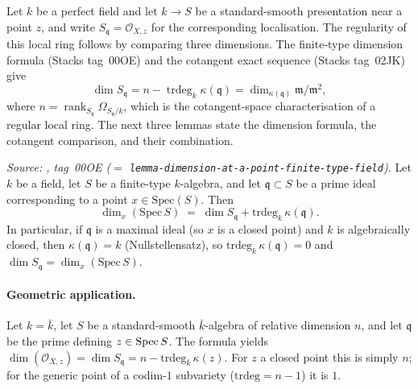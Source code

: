 Let \(k\) be a perfect field and let \(k \to S\) be a standard-smooth
presentation near a point \(z\),
and write \(S_{\mathfrak q}=\mathcal O_{X,z}\) for the corresponding
localisation.  The regularity of this local ring follows by comparing
three dimensions.  The finite-type dimension formula (Stacks tag~00OE)
and the cotangent exact sequence (Stacks tag~02JK) give
\[
  \dim S_{\mathfrak q}
  = n-\operatorname{trdeg}_k\kappa(\mathfrak q)
  = \dim_{\kappa(\mathfrak q)} \mathfrak m / \mathfrak m^2,
\]
where \(n=\operatorname{rank}_{S_{\mathfrak q}}
\Omega_{S_{\mathfrak q}/k}\),
which is the cotangent-space characterisation of a regular local ring.
The next three lemmas state the dimension formula, the cotangent
comparison, and their combination.

\begin{lemma}
  \label{mk-lem:smooth_algebra_krull_dim_formula}

  \textit{Source: \cite{stacks-project}, tag~00OE (\(=\) \texttt{lemma-dimension-at-a-point-finite-type-field}).}
  Let \(k\) be a field, let \(S\) be a finite-type \(k\)-algebra, and let
  \(\mathfrak q \subset S\) be a prime ideal corresponding to a point
  \(x \in \mathrm{Spec}(S)\). Then
  \[
    \dim_x(\mathrm{Spec}\,S)
    \;=\; \dim S_{\mathfrak q} + \mathrm{trdeg}_k\,\kappa(\mathfrak q).
  \]
  In particular, if \(\mathfrak q\) is a maximal ideal (so \(x\) is a
  closed point) and \(k\) is algebraically closed, then
  \(\kappa(\mathfrak q) = k\) (Nullstellensatz), so
  \(\mathrm{trdeg}_k\,\kappa(\mathfrak q) = 0\) and
  \(\dim S_{\mathfrak q} = \dim_x(\mathrm{Spec}\,S)\).

  \paragraph{Geometric application.} Let \(k = \bar k\), let
  \(S\) be a standard-smooth \(\bar k\)-algebra of relative dimension
  \(n\), and let \(\mathfrak q\) be the prime defining \(z \in \operatorname{Spec} S\).  The
  formula yields \(\dim(\mathcal O_{X, z}) = \dim S_{\mathfrak q} = n -
  \mathrm{trdeg}_{\bar k}\,\kappa(z)\). For \(z\) a closed point this is
  simply \(n\); for the generic point of a codim-\(1\) subvariety
  (\(\mathrm{trdeg} = n - 1\)) it is \(1\).
\end{lemma}
